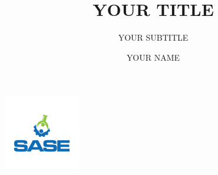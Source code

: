 \documentclass{beamer}
\title{YOUR TITLE}
\subtitle{YOUR SUBTITLE}
\author{YOUR NAME}
\institute{SASE}
\begin{document}
\begin{frame}
    \titlepage
    \includegraphics[width=0.25\textwidth, right]{sase.png}
\end{frame}
\end{document}
